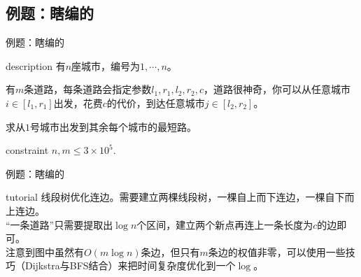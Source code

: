 \documentclass{beamer}
\begin{document}
\subsection{例题：瞎编的}
\begin{frame}{例题：瞎编的}
	\begin{block}{description}
		有$n$座城市，编号为$1, \cdots, n$。
		
		有$m$条道路，每条道路会指定参数$l_1, r_1, l_2, r_2, c$，道路很神奇，你可以从任意城市$i \in [l_1, r_1]$出发，花费$c$的代价，到达任意城市$j \in [l_2, r_2]$。
		
		求从$1$号城市出发到其余每个城市的最短路。
	\end{block}
	\begin{block}{constraint}
		$n, m \le 3 \times 10^5.$
	\end{block}
\end{frame}
\begin{frame}{例题：瞎编的}
	\begin{block}{tutorial}
		线段树优化连边。需要建立两棵线段树，一棵自上而下连边，一棵自下而上连边。\\
		
		“一条道路”只需要提取出$\log n$个区间，建立两个新点再连上一条长度为$c$的边即可。\\
		
		注意到图中虽然有$O(m\log n)$条边，但只有$m$条边的权值非零，可以使用一些技巧（Dijkstra与BFS结合）来把时间复杂度优化到一个$\log$。
	\end{block}
\end{frame}
\end{document}
